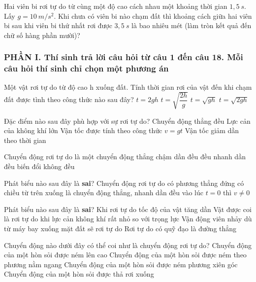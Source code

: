 \begin{ex}%
Hai viên bi rơi tự do từ cùng một độ cao cách nhau một khoảng thời gian $1,5\ s$. Lấy $g=10\ m/s^2$. Khi chưa có viên bi nào chạm đất thì khoảng cách giữa hai viên bi sau khi viên bi thứ nhất rơi được $3,5\ s$ là bao nhiêu mét (làm tròn kết quả đến chữ số hàng phần mười)?
\loigiai{}
\end{ex}

\newpage 

\subsubsection*{PHẦN I. Thí sinh trả lời câu hỏi từ câu 1 đến câu 18. Mỗi câu hỏi thí sinh chỉ chọn một phương án}
\setcounter{ex}{0}
\begin{ex}%
Một vật rơi tự do từ độ cao h xuống đất. Tính thời gian rơi của vật đến khi chạm đất được tình theo công thức nào sau đây?
\choice
{$t=2 gh$}
{\True $t=\sqrt{\dfrac{2 h}{g}}$}
{$t=\sqrt{gh}$}
{$t=\sqrt{2 gh}$}

 \end{ex}
\begin{ex}%
Đặc điểm nào sau đây phù hợp với sự rơi tự do?
\choice
{Chuyển động thẳng đều}
{Lực cản của không khí lớn}
{\True Vận tốc được tính theo công thức $v = gt$}
{Vận tốc giảm dần theo thời gian}
 \end{ex}
\begin{ex}%
Chuyển động rơi tự do là một chuyển động thẳng
\choice
{chậm dần đều}
{đều}
{\True nhanh dần đều}
{biến đổi không đều}

 \end{ex}
\begin{ex}%
Phát biểu nào sau đây là \textbf{sai}?  Chuyển động rơi tự do
\choice
{có phương thẳng đứng}
{có chiều từ trên xuống}
{là chuyển động thẳng, nhanh dần đều}
{\True vào lúc $t=0$ thì $v \neq 0$}

 \end{ex}
\begin{ex}%
Phát biểu nào sau đây là \textbf{sai}?
\choice
{Khi rơi tự do tốc độ của vật tăng dần}
{Vật được coi là rơi tự do khi lực cản không khí rất nhỏ so với trọng lực}
{\True Vận động viên nhảy dù từ máy bay xuống mặt đất sẽ rơi tự do}
{Rơi tự do có quỹ đạo là đường thẳng}
 \end{ex}
\begin{ex}%
Chuyển động nào dưới đây có thể coi như là chuyển động rơi tự do?
\choice
{Chuyển động của một hòn sỏi được ném lên cao}
{Chuyển động của một hòn sỏi được ném theo phương nằm ngang}
{Chuyển động của một hòn sỏi được ném phương xiên góc}
{\True Chuyển động của một hòn sỏi được thả rơi xuống}
 \end{ex}
